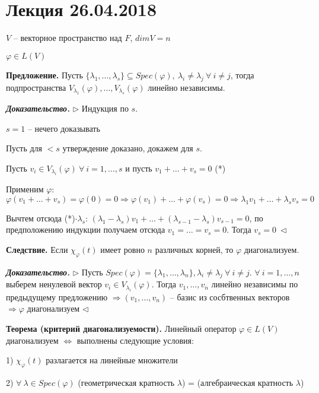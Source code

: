 \section{Лекция 26.04.2018}

$V$ -- векторное пространство над $F$, $dimV = n$

$\varphi \in L(V)$

\bigskip
\textbf{Предложение.} Пусть $\{\lambda_1, \dots, \lambda_s\} \subseteq Spec(\varphi), \ \lambda_i \neq \lambda_j \ \forall \ i \neq j$, тогда подпространства $V_{\lambda_1} (\varphi), \dots, V_{\lambda_s} (\varphi)$ линейно независимы.

\bigskip
\textbf{\textit{Доказательство.}} $\rhd$ Индукция по $s$.

$s = 1$ -- нечего доказывать

Пусть для $< s$ утверждение доказано, докажем для $s$.

Пусть $v_i \in V_{\lambda_i} (\varphi) \ \forall \ i = 1, \dots, s$ и пусть $v_1 + \dots + v_s = 0$ (*)

Применим $\varphi$: $\varphi(v_1 + \dots + v_s) = \varphi(0) = 0 \Rightarrow \varphi(v_1) + \dots + \varphi(v_s) = 0 \Rightarrow \lambda_1 v_1 + \dots + \lambda_s v_s = 0$

Вычтем отсюда (*)$\cdot \lambda_s$: $(\lambda_1 - \lambda_s) v_1 + \dots + (\lambda_{s-1} - \lambda_s) v_{s - 1} = 0$, по предположению индукции получаем отсюда $v_1 = \dots = v_s = 0$. Тогда $v_s = 0 \ \lhd$ 

\bigskip
\textbf{Следствие.} Если $\chi_{\varphi}(t)$ имеет ровно $n$ различных корней, то $\varphi$ диагонализуем.

\bigskip
\textbf{\textit{Доказательство.}} $\rhd$ Пусть $Spec (\varphi) = \{\lambda_1, \dots, \lambda_n\}, \lambda_i \neq \lambda_j \ \forall \ i \neq j$. $\forall \ i = 1, \dots, n$ выберем ненулевой вектор $v_i \in V_{\lambda_i} (\varphi)$. Тогда $v_1, \dots, v_n$ линейно независимы по предыдущему предложению $\Rightarrow (v_1, \dots, v_n)$ -- базис из сосбтвенных векторов $\Rightarrow \varphi$ диагонализуем $\lhd$

\bigskip
\textbf{Теорема (критерий диагонализуемости).} Линейный оператор $\varphi \in L(V)$ диагонализуем $\Leftrightarrow$ выполнены следующие условия:

1) $\chi_{\varphi} (t)$ разлагается на линейные множители

2) $\forall \ \lambda \in Spec(\varphi)$ (геометрическая кратность $\lambda$) = (алгебраическая кратность $\lambda$)

